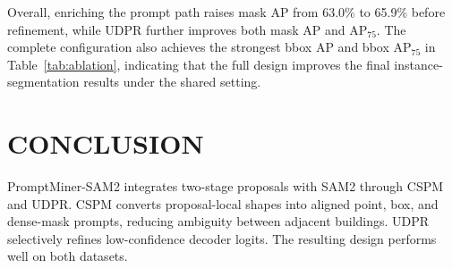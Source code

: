 \documentclass{article}
\begin{document}
Overall, enriching the prompt path raises mask AP from 63.0\% to 65.9\%
before refinement, while UDPR further improves both mask AP and AP$_{75}$.
The complete configuration also achieves the strongest bbox AP and bbox
AP$_{75}$ in Table~\ref{tab:ablation}, indicating that the full design
improves the final instance-segmentation results under the shared setting.

\begin{table}[H]
\caption{Prompt-path ablation on NWPU VHR-10. $P$, $B$, and $M$ denote point, box, and dense-mask prompts.}
\label{tab:ablation}
\centering
\scriptsize
{}
\end{table}

\section{CONCLUSION}
PromptMiner-SAM2 integrates two-stage proposals with SAM2 through CSPM and
UDPR. CSPM converts proposal-local shapes into aligned point, box, and
dense-mask prompts, reducing ambiguity between adjacent buildings. UDPR
selectively refines low-confidence decoder logits. The resulting design
performs well on both datasets.
\end{document}
